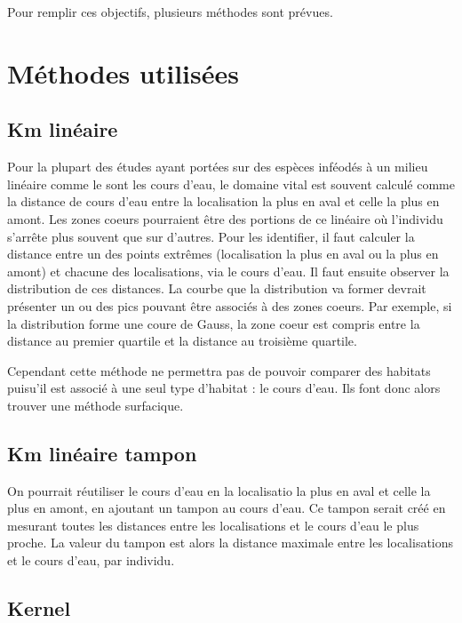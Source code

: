 \documentclass[
  letterpaper,
  DIV=11,
  numbers=noendperiod]{scrreprt}
\begin{document}
Pour remplir ces objectifs, plusieurs méthodes sont prévues.

\section{Méthodes utilisées}\label{muxe9thodes-utilisuxe9es}

\subsection{Km linéaire}\label{km-linuxe9aire}

Pour la plupart des études ayant portées sur des espèces inféodés à un
milieu linéaire comme le sont les cours d'eau, le domaine vital est
souvent calculé comme la distance de cours d'eau entre la localisation
la plus en aval et celle la plus en amont. Les zones coeurs pourraient
être des portions de ce linéaire où l'individu s'arrête plus souvent que
sur d'autres. Pour les identifier, il faut calculer la distance entre un
des points extrêmes (localisation la plus en aval ou la plus en amont)
et chacune des localisations, via le cours d'eau. Il faut ensuite
observer la distribution de ces distances. La courbe que la distribution
va former devrait présenter un ou des pics pouvant être associés à des
zones coeurs. Par exemple, si la distribution forme une coure de Gauss,
la zone coeur est compris entre la distance au premier quartile et la
distance au troisième quartile.

Cependant cette méthode ne permettra pas de pouvoir comparer des
habitats puisu'il est associé à une seul type d'habitat : le cours
d'eau. Ils font donc alors trouver une méthode surfacique.

\subsection{Km linéaire tampon}\label{km-linuxe9aire-tampon}

On pourrait réutiliser le cours d'eau en la localisatio la plus en aval
et celle la plus en amont, en ajoutant un tampon au cours d'eau. Ce
tampon serait créé en mesurant toutes les distances entre les
localisations et le cours d'eau le plus proche. La valeur du tampon est
alors la distance maximale entre les localisations et le cours d'eau,
par individu.

\subsection{Kernel}\label{kernel}
\end{document}
